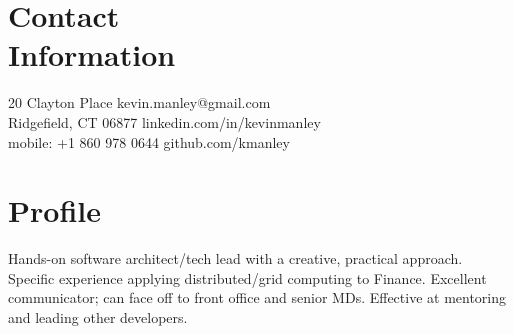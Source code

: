\documentclass[margin,line]{resume}
\begin{document}
\begin{resume}

    \section{\mysidestyle Contact\\Information}

    20 Clayton Place			                            \hfill kevin.manley@gmail.com       \vspace{0mm}\\\vspace{0mm}%
    Ridgefield, CT 06877                                    \hfill linkedin.com/in/kevinmanley        \vspace{0mm}\\\vspace{0mm}%
    mobile: +1 860 978 0644                                 \hfill github.com/kmanley  \vspace{0mm}\\\vspace{-4.5mm}%


    \section{\mysidestyle Profile}

    Hands-on software architect/tech lead with a creative, practical approach. Specific experience applying distributed/grid computing
    to Finance. Excellent communicator; can face off to front office and senior MDs. Effective at mentoring and leading other developers.



\end{resume}
\end{document}
